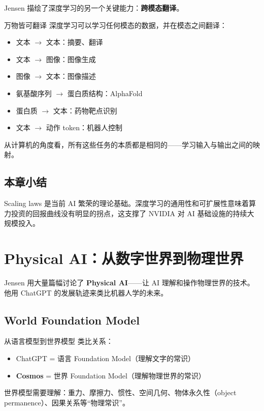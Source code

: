 \documentclass[a4paper]{article}
\begin{document}
Jensen 描绘了深度学习的另一个关键能力：\textbf{跨模态翻译}。

\begin{knowledgebox}{万物皆可翻译}
深度学习可以学习任何模态的数据，并在模态之间翻译：
\begin{itemize}
    \item 文本 $\to$ 文本：摘要、翻译
    \item 文本 $\to$ 图像：图像生成
    \item 图像 $\to$ 文本：图像描述
    \item 氨基酸序列 $\to$ 蛋白质结构：AlphaFold
    \item 蛋白质 $\to$ 文本：药物靶点识别
    \item 文本 $\to$ 动作 token：机器人控制
\end{itemize}
从计算机的角度看，所有这些任务的本质都是相同的——学习输入与输出之间的映射。
\end{knowledgebox}

\subsection{本章小结}
Scaling laws 是当前 AI 繁荣的理论基础。深度学习的通用性和可扩展性意味着算力投资的回报曲线没有明显的拐点，这支撑了 NVIDIA 对 AI 基础设施的持续大规模投入。

\section{Physical AI：从数字世界到物理世界}

Jensen 用大量篇幅讨论了 \textbf{Physical AI}——让 AI 理解和操作物理世界的技术。他用 ChatGPT 的发展轨迹来类比机器人学的未来。

\subsection{World Foundation Model}

\begin{importantbox}{从语言模型到世界模型}
类比关系：
\begin{itemize}
    \item ChatGPT = 语言 Foundation Model（理解文字的常识）
    \item \textbf{Cosmos} = 世界 Foundation Model（理解物理世界的常识）
\end{itemize}
世界模型需要理解：重力、摩擦力、惯性、空间几何、物体永久性（object permanence）、因果关系等``物理常识''。
\end{importantbox}
\end{document}
